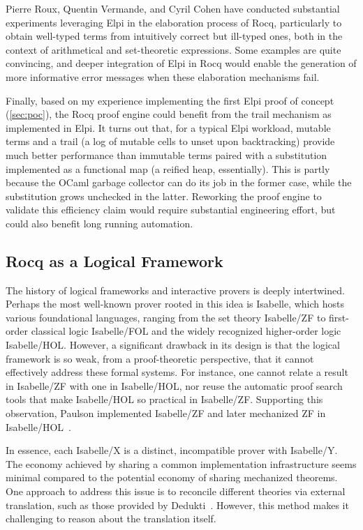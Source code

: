 \documentclass{these-ISSS}
\begin{document}
Pierre Roux, Quentin Vermande, and Cyril Cohen have conducted substantial
experiments leveraging Elpi in the elaboration process of Rocq, particularly
to obtain well-typed terms from intuitively correct but ill-typed ones, both
in the context of arithmetical and set-theoretic expressions. Some examples are
quite convincing, and deeper integration of Elpi in Rocq would enable the
generation of more informative error messages when these elaboration
mechanisms fail.

Finally, based on my experience implementing the first Elpi proof of concept
(\cref{sec:poc}), the Rocq proof engine could benefit from the trail mechanism
as implemented in Elpi. It turns out that, for a typical Elpi workload, mutable
terms and a trail (a log of mutable cells to unset upon backtracking) provide
much better performance than immutable terms paired with a substitution
implemented as a functional map (a reified heap, essentially). This is partly
because the OCaml garbage collector can do its job in the former case, while
the substitution grows unchecked in the latter. Reworking the proof engine to
validate this efficiency claim would require substantial engineering effort, but
could also benefit long running automation.

\subsection{Rocq as a Logical Framework}

The history of logical frameworks and interactive provers is deeply intertwined.
Perhaps the most well-known prover rooted in this idea is Isabelle, which hosts
various foundational languages, ranging from the set theory Isabelle/ZF to
first-order classical logic Isabelle/FOL and the widely recognized higher-order
logic Isabelle/HOL. However, a significant drawback in its design is that the
logical framework is so weak, from a proof-theoretic perspective, that it cannot
effectively address these formal systems. For instance, one cannot relate a
result in Isabelle/ZF with one in Isabelle/HOL, nor reuse the automatic proof
search tools that make Isabelle/HOL so practical in Isabelle/ZF. Supporting this
observation, Paulson implemented Isabelle/ZF and later mechanized ZF in
Isabelle/HOL~\cite{zfhol}.

In essence, each Isabelle/X is a distinct, incompatible prover with Isabelle/Y.
The economy achieved by sharing a common implementation infrastructure seems
minimal compared to the potential economy of sharing mechanized theorems. One
approach to address this issue is to reconcile different theories via external
translation, such as those provided by Dedukti~\cite{dedukti}. However, this
method makes it challenging to reason about the translation itself.
\end{document}
